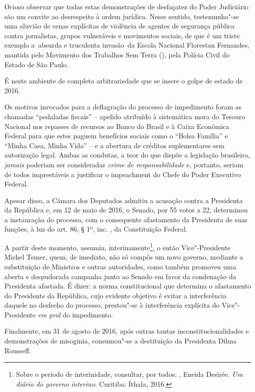 Ocioso observar que todas estas demonstrações de desfaçatez do Poder
Judiciário são um convite ao desrespeito à ordem jurídica. Nesse
sentido, testemunha"-se uma aluvião de cenas explícitas de violência de
agentes de segurança pública contra jornalistas, grupos vulneráveis e
movimentos sociais, de que é um triste exemplo a~absurda e truculenta
invasão~da Escola Nacional Florestan Fernandes, mantida pelo Movimento
dos Trabalhos Sem Terra (), pela Polícia Civil do Estado de São
Paulo.

É neste ambiente de completa arbitrariedade que se insere o golpe de
estado de 2016.

Os motivos invocados para a deflagração do processo de impedimento foram
as chamadas ``pedaladas fiscais'' -- apelido atribuído à sistemática
mora do Tesouro Nacional nos repasses de recursos ao Banco do Brasil e à
Caixa Econômica Federal para que estes paguem benefícios sociais como o
``Bolsa Família'' e ``Minha Casa, Minha Vida'' -- e a abertura de
créditos suplementares sem autorização legal. Ambas as condutas, a teor
do que dispõe a legislação brasileira, \emph{jamais} poderiam ser
consideradas \emph{crime de responsabilidade} e, portanto, seriam de
todos imprestáveis a justificar o impeachment do Chefe do Poder
Executivo Federal.

Apesar disso, a Câmara dos Deputados admitiu a acusação contra a
Presidenta da República e, em 12 de maio de 2016, o Senado, por 55 votos
a 22, determinou a instauração do processo, com o consequente
afastamento da Presidenta de suas funções, à luz do art. 86, §
1º, inc. , da Constituição Federal.

A partir deste momento, assumiu, interinamente\footnote{Sobre o período
  de interinidade, consultar, por todos: , Eneida Desirée.
  \emph{Um diário do governo interino}. Curitiba: Íthala, 2016.}, o
então Vice"-Presidente Michel Temer, quem, de imediato, não só compôs um
novo governo, mediante a substituição de Ministros e outras autoridades,
como também promoveu uma aberta e despudorada campanha junto ao Senado
em favor da condenação da Presidenta afastada. É dizer: a norma
constitucional que determina o afastamento do Presidente da República,
cujo evidente objetivo é evitar a interferência daquele no desfecho do
processo, prestou"-se à interferência explícita do Vice"-Presidente
\emph{em prol} do impedimento.

Finalmente, em 31 de agosto de 2016, após outras tantas
inconstitucionalidades e demonstrações de misoginia, consumou"-se a
destituição da Presidenta Dilma Rousseff.

